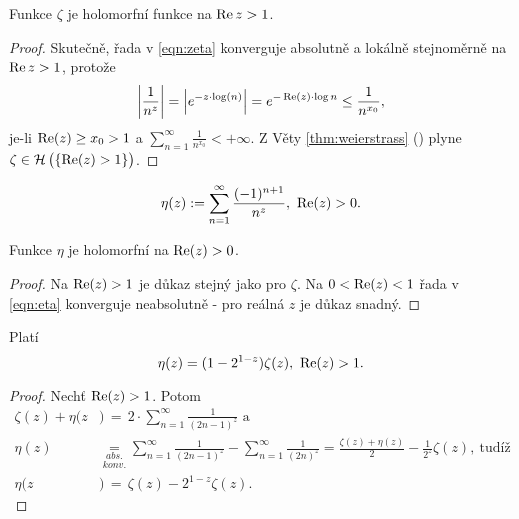 \begin{lemma}
Funkce $\zeta$ je holomorfní funkce na $\operatorname{Re} z>1$.
\end{lemma}

\begin{proof}
Skutečně, řada v \cref{eqn:zeta} konverguje absolutně a lokálně stejnoměrně na $\operatorname{Re} z>1$, protože $$\left|\frac{1}{n^z}\right|=\left|e^{-z\cdot \log(n)}\right|=e^{-\operatorname{Re}(z)\cdot\log n}\leq\frac{1}{n^{x_0}},$$ 
je-li $\operatorname{Re} (z)\geq x_0>1$ a $\sum_{n=1}^\infty\frac{1}{n^{x_0}}<+\infty$. Z Věty \cref{thm:weierstrass} () plyne\\ $\zeta\in\operatorname{\mathcal{H}}\big(\{\operatorname{Re}(z)>1\}\big)$.
\end{proof}

\begin{definition}
\begin{equation}\label{eqn:eta}
    \eta(z):=\sum_{n=1}^\infty \frac{(-1)^{n+1}}{n^z},\ \Rel(z)>0.
\end{equation}
\end{definition}

\begin{lemma}
Funkce $\eta$ je holomorfní na $\operatorname{Re}(z)>0$.
\end{lemma}

\begin{proof}
Na $\operatorname{Re}(z)>1$ je důkaz stejný jako pro $\zeta$. Na $0<\operatorname{Re}(z)<1$ řada v \cref{eqn:eta} konverguje neabsolutně - pro reálná $z$ je důkaz snadný.
\end{proof}

\begin{lemma}\label{lemma:etaZetaRelation} Platí
\begin{equation*}
    \eta(z)=(1-2^{1-z})\zeta(z),\ \Rel(z)>1.
\end{equation*}
\end{lemma}

\begin{proof}
Nechť $\operatorname{Re}(z)>1$. Potom \begin{align*}
    \zeta(z)+\eta(z&)\,=\,2\cdot\sum_{n=1}^\infty \frac{1}{(2n-1)^z} \text{ a}\\
    \eta(z)&\underset{konv.}{\underset{abs.}{=}}\sum_{n=1}^\infty \frac{1}{(2n-1)^z}-\sum_{n=1}^\infty\frac{1}{(2n)^z}=\frac{\zeta(z)+\eta(z)}{2}-\frac{1}{2^z}\zeta(z),\ \text{tudíž}\\
    \eta(z&)\,=\,\zeta(z)-2^{1-z}\zeta(z).
\end{align*}
\end{proof}

